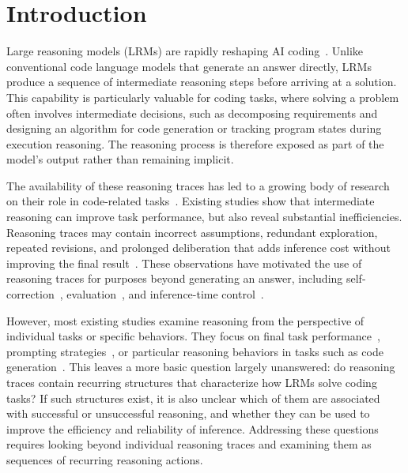 \documentclass[acmsmall,screen,review,anonymous]{acmart}
\begin{document}


\maketitle

\section{Introduction}

Large reasoning models (LRMs) are rapidly reshaping AI coding~\cite{codethinksurvey,sweagent2024}. Unlike conventional code language models that generate an answer directly, LRMs produce a sequence of intermediate reasoning steps before arriving at a solution. This capability is particularly valuable for coding tasks, where solving a problem often involves intermediate decisions, such as decomposing requirements and designing an algorithm for code generation or tracking program states during execution reasoning. The reasoning process is therefore exposed as part of the model's output rather than remaining implicit.

The availability of these reasoning traces has led to a growing body of research on their role in code-related tasks~\cite{wei2022cot,deepseekr1}. 
Existing studies show that intermediate reasoning can improve task performance, but also reveal substantial inefficiencies. Reasoning traces may contain incorrect assumptions, redundant exploration, repeated revisions, and prolonged deliberation that adds inference cost without improving the final result~\cite{revisitcotcodegen,cotcodequality,thinkingpatterns,overthinking2025}. These observations have motivated the use of reasoning traces for purposes beyond generating an answer, including self-correction~\cite{reflexion,selfrefine}, evaluation~\cite{codevisionary2025,judgeuncertainty2025}, and inference-time control~\cite{seer2025,turncontrol2025}. 

However, most existing studies examine reasoning from the perspective of individual tasks or specific behaviors. They focus on final task performance~\cite{codex,livecodebench,swebench2024}, prompting strategies~\cite{wei2022cot,selfconsistency,codecot}, or particular reasoning behaviors in tasks such as code generation~\cite{revisitcotcodegen,cotcodequality,thinkingpatterns,reasoningsteps2026}. This leaves a more basic question largely unanswered: do reasoning traces contain recurring structures that characterize how LRMs solve coding tasks? If such structures exist, it is also unclear which of them are associated with successful or unsuccessful reasoning, and whether they can be used to improve the efficiency and reliability of inference. Addressing these questions requires looking beyond individual reasoning traces and examining them as sequences of recurring reasoning actions.
\end{document}
